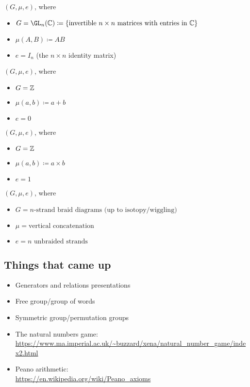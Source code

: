 \begin{example}
    $(G,\mu,e)$, where
    \begin{itemize}
        \item $G = \GL_n(\C) \coloneq \{ \text{invertible $n\times n$ matrices with entries in $\C$}\}$
        \item $\mu(A,B) \coloneq AB$
        \item $e = I_n$ (the $n\times n$ identity matrix)
    \end{itemize}
\end{example}

\begin{example}[Integers]
    $(G,\mu,e)$, where
    \begin{itemize}
        \item $G = \mathbb{Z}$
        \item $\mu(a,b) \coloneq a+b$
        \item $e = 0$
    \end{itemize}
\end{example}

\begin{example}
    $(G,\mu,e)$, where
    \begin{itemize}
        \item $G = \mathbb{Z}$
        \item $\mu(a,b) \coloneq a\times b$
        \item $e = 1$
    \end{itemize}
\end{example}

\begin{example}
    $(G,\mu,e)$, where
    \begin{itemize}
        \item $G = \text{$n$-strand braid diagrams (up to isotopy/wiggling)}$
        \item $\mu = \text{vertical concatenation}$
        \item $e = \text{$n$ unbraided strands}$
    \end{itemize}
\end{example}

\subsection*{Things that came up}
\begin{itemize}
    \item Generators and relations presentations
    \item Free group/group of words
    \item Symmetric group/permutation groups
    \item The natural numbers game: \\ 
    \url{https://www.ma.imperial.ac.uk/~buzzard/xena/natural_number_game/index2.html}
    \item Peano arithmetic: \\ 
    \url{https://en.wikipedia.org/wiki/Peano_axioms}
\end{itemize}